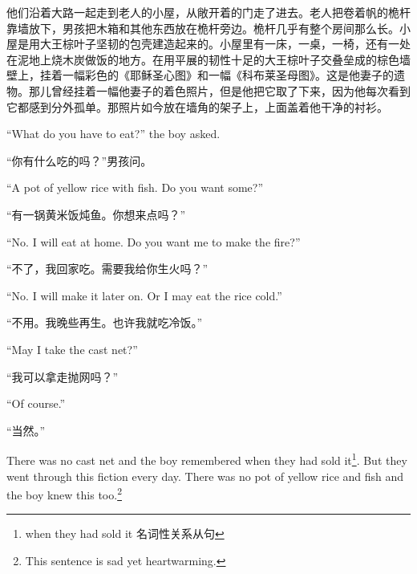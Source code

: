 \begin{paracol}{2}
\switchcolumn

他们沿着大路一起走到老人的小屋，从敞开着的门走了进去。老人把卷着帆的桅杆靠墙放下，男孩把木箱和其他东西放在桅杆旁边。桅杆几乎有整个房间那么长。小屋是用大王棕叶子坚韧的包壳建造起来的。小屋里有一床，一桌，一椅，还有一处在泥地上烧木炭做饭的地方。在用平展的韧性十足的大王棕叶子交叠垒成的棕色墙壁上，挂着一幅彩色的《耶稣圣心图》和一幅《科布莱圣母图》。这是他妻子的遗物。那儿曾经挂着一幅他妻子的着色照片，但是他把它取了下来，因为他每次看到它都感到分外孤单。那照片如今放在墙角的架子上，上面盖着他干净的衬衫。

\switchcolumn*

``What do you have to eat?'' the boy asked.

\switchcolumn

“你有什么吃的吗？”男孩问。

\switchcolumn*

``A \gls{pot} of yellow rice with fish. Do you want some?''

\switchcolumn

“有一锅黄米饭炖鱼。你想来点吗？”

\switchcolumn*

``No. I will eat at home. Do you want me to make the fire?''

\switchcolumn

“不了，我回家吃。需要我给你生火吗？”

\switchcolumn*

``No. I will make it later on. Or I may eat the rice cold.''

\switchcolumn

“不用。我晚些再生。也许我就吃冷饭。”

\switchcolumn*

``May I take the cast net?''

\switchcolumn

“我可以拿走抛网吗？”

\switchcolumn*

``Of course.''

\switchcolumn

“当然。”

\switchcolumn*

There was no cast net and the boy remembered when they had sold
it\footnote{when they had sold it 名词性关系从句}. But they went through
this \gls{fiction} every day. There was no pot of yellow rice and fish and the boy
knew this too.\footnote{This sentence is sad yet heartwarming.}

\switchcolumn


\end{paracol}
